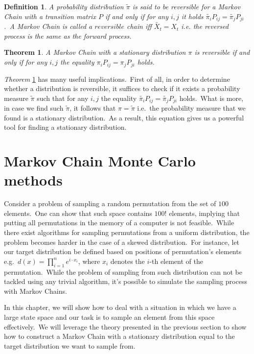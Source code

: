 \documentclass[a4paper, 11pt, onecolumn, openany, titlepage]{report}
\newcommand\numberedchapter[1]{\setlength\topskip{3cm}\chapter{#1}\setlength\topskip{0cm}}
\theoremstyle{default_theorem_style}\newtheorem{theorem}{Theorem}
\theoremstyle{default_theorem_style}\newtheorem{definition}{Definition}
\begin{document}
\begin{definition}
A probability distribution $\tilde{\pi}$ is said to be \textit{reversible} for a Markov Chain with a transition
matrix $P$ if and only if for any $i,j$ it holds $\tilde{\pi_i} P_{ij} = \tilde{\pi_j} P_{ji}$.\ A Markov Chain
is called a $reversible$ chain iff $\tilde{X_t} = X_t$ i.e. the reversed process is the same as the forward process.
\end{definition}

\begin{theorem}\label{reversible_chain}
A Markov Chain with a stationary distribution $\pi$ is reversible if and only if for any $i, j$ the equality
$\pi_i P_{ij} = \pi_j P_{ji}$ holds.
\end{theorem}

\textit{Theorem} \ref{reversible_chain} has many useful implications.\ First of all, in order to determine whether
a distribution is reversible, it suffices to check if it exists a probability measure $\tilde{\pi}$ such that
for any $i, j$ the equality $\tilde{\pi_i} P_{ij} = \tilde{\pi_j} P_{ji}$ holds.\ What is more, in case we find such
$\tilde{\pi}$, it follows that $\pi = \tilde{\pi}$ i.e.\ the probability measure that we found is a stationary
distribution.\ As a result, this equation gives us a powerful tool for finding a stationary distribution.

\numberedchapter{Markov Chain Monte Carlo methods}\label{chapter:mcmc}

Consider a problem of sampling a random permutation from the set of $100$ elements.\ One can show that such space
contains $100!$ elements, implying that putting all permutations in the memory of a computer is not feasible.\ While
there exist algorithms for sampling permutations from a uniform distribution, the problem becomes harder in the case of
a skewed distribution.\ For instance, let our target distribution be defined based on positions of permutation's
elements e.g.\ $d(x) = \prod_{i = 1}^{n} e^{i \cdot x_i}$, where $x_i$ denotes the $i$-th element of the
permutation.\ While the problem of sampling from such distribution can not be tackled using any trivial algorithm,
it's possible to simulate the sampling process with Markov Chains.\newline

In this chapter, we will show how to deal with a situation in which we have a large state space and our task is to
sample an element from this space effectively.\ We will leverage the theory presented in the previous section to
show how to construct a Markov Chain with a stationary distribution equal to the target distribution we want to
sample from.
\end{document}
